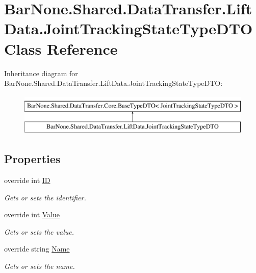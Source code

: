 \hypertarget{class_bar_none_1_1_shared_1_1_data_transfer_1_1_lift_data_1_1_joint_tracking_state_type_d_t_o}{}\section{Bar\+None.\+Shared.\+Data\+Transfer.\+Lift\+Data.\+Joint\+Tracking\+State\+Type\+D\+TO Class Reference}
\label{class_bar_none_1_1_shared_1_1_data_transfer_1_1_lift_data_1_1_joint_tracking_state_type_d_t_o}
Inheritance diagram for Bar\+None.\+Shared.\+Data\+Transfer.\+Lift\+Data.\+Joint\+Tracking\+State\+Type\+D\+TO\+:\begin{figure}[H]
\begin{center}
\leavevmode
\includegraphics[height=2.000000cm]{class_bar_none_1_1_shared_1_1_data_transfer_1_1_lift_data_1_1_joint_tracking_state_type_d_t_o}
\end{center}
\end{figure}
\subsection*{Properties}
\begin{DoxyCompactItemize}
\item 
override int \mbox{\hyperlink{class_bar_none_1_1_shared_1_1_data_transfer_1_1_lift_data_1_1_joint_tracking_state_type_d_t_o_a55a08013b8d7048fd28a6990c95a9960}{ID}}
\begin{DoxyCompactList}\small\item\em Gets or sets the identifier. \end{DoxyCompactList}\item 
override int \mbox{\hyperlink{class_bar_none_1_1_shared_1_1_data_transfer_1_1_lift_data_1_1_joint_tracking_state_type_d_t_o_af6c5ca48d8a8aefcebbafd7a9ed34028}{Value}}
\begin{DoxyCompactList}\small\item\em Gets or sets the value. \end{DoxyCompactList}\item 
override string \mbox{\hyperlink{class_bar_none_1_1_shared_1_1_data_transfer_1_1_lift_data_1_1_joint_tracking_state_type_d_t_o_ac072caf0018045338c7b2675f04bfa58}{Name}}
\begin{DoxyCompactList}\small\item\em Gets or sets the name. \end{DoxyCompactList}\end{DoxyCompactItemize}


